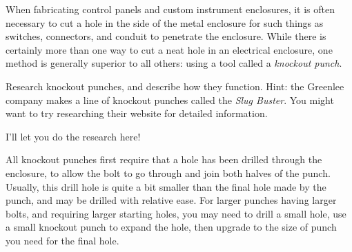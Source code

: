 

When fabricating control panels and custom instrument enclosures, it is often necessary to cut a hole in the side of the metal enclosure for such things as switches, connectors, and conduit to penetrate the enclosure.  While there is certainly more than one way to cut a neat hole in an electrical enclosure, one method is generally superior to all others: using a tool called a {\it knockout punch}.

Research knockout punches, and describe how they function.  Hint: the Greenlee company makes a line of knockout punches called the {\it Slug Buster}.  You might want to try researching their website for detailed information.







I'll let you do the research here!







All knockout punches first require that a hole has been drilled through the enclosure, to allow the bolt to go through and join both halves of the punch.  Usually, this drill hole is quite a bit smaller than the final hole made by the punch, and may be drilled with relative ease.  For larger punches having larger bolts, and requiring larger starting holes, you may need to drill a small hole, use a small knockout punch to expand the hole, then upgrade to the size of punch you need for the final hole.




